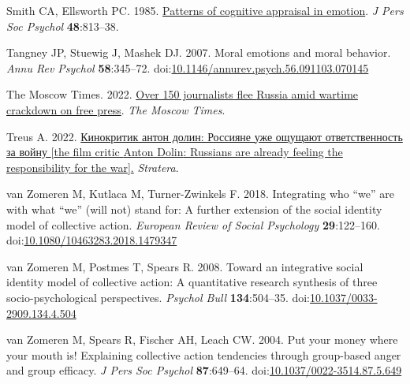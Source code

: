 \documentclass[
]{article}
\newlength{\cslhangindent}
\newlength{\cslentryspacingunit} %
\newenvironment{CSLReferences}[2] %
 {%
  \setlength{\parindent}{0pt}
  \ifodd #1
  \let\oldpar\par
  \def\par{\hangindent=\cslhangindent\oldpar}
  \fi
  \setlength{\parskip}{#2\cslentryspacingunit}
 }%
 {}
\begin{document}
\begin{CSLReferences}{1}{0}
\leavevmode{}%
Smith CA, Ellsworth PC. 1985. \href{https://www.ncbi.nlm.nih.gov/pubmed/3886875}{Patterns of cognitive appraisal in emotion}. \emph{J Pers Soc Psychol} \textbf{48}:813--38.

\leavevmode{}%
Tangney JP, Stuewig J, Mashek DJ. 2007. Moral emotions and moral behavior. \emph{Annu Rev Psychol} \textbf{58}:345--72. doi:\href{https://doi.org/10.1146/annurev.psych.56.091103.070145}{10.1146/annurev.psych.56.091103.070145}

\leavevmode{}%
The Moscow Times. 2022. \href{https://www.themoscowtimes.com/2022/03/07/over-150-journalists-flee-russia-amid-wartime-crackdown-on-free-press-reports-a76809\%20on\%2030.03.2023}{Over 150 journalists flee {Russia} amid wartime crackdown on free press}. \emph{The Moscow Times}.

\leavevmode{}%
Treus A. 2022. \href{https://aussiedlerbote.de/2022/11/kinokritik-anton-dolin-rossiyane-uzhe-oshhushhayut-otvetstvennost-za-vojnu/}{Кинокритик антон долин: Россияне уже ощущают ответственность за войну {[}the film critic {Anton Dolin}: Russians are already feeling the responsibility for the war{]}.} \emph{Stratera}.

\leavevmode{}%
van Zomeren M, Kutlaca M, Turner-Zwinkels F. 2018. Integrating who {``}we{''} are with what {``}we{''} (will not) stand for: A further extension of the social identity model of collective action. \emph{European Review of Social Psychology} \textbf{29}:122--160. doi:\href{https://doi.org/10.1080/10463283.2018.1479347}{10.1080/10463283.2018.1479347}

\leavevmode{}%
van Zomeren M, Postmes T, Spears R. 2008. Toward an integrative social identity model of collective action: A quantitative research synthesis of three socio-psychological perspectives. \emph{Psychol Bull} \textbf{134}:504--35. doi:\href{https://doi.org/10.1037/0033-2909.134.4.504}{10.1037/0033-2909.134.4.504}

\leavevmode{}%
van Zomeren M, Spears R, Fischer AH, Leach CW. 2004. Put your money where your mouth is! Explaining collective action tendencies through group-based anger and group efficacy. \emph{J Pers Soc Psychol} \textbf{87}:649--64. doi:\href{https://doi.org/10.1037/0022-3514.87.5.649}{10.1037/0022-3514.87.5.649}


\end{CSLReferences}
\end{document}
